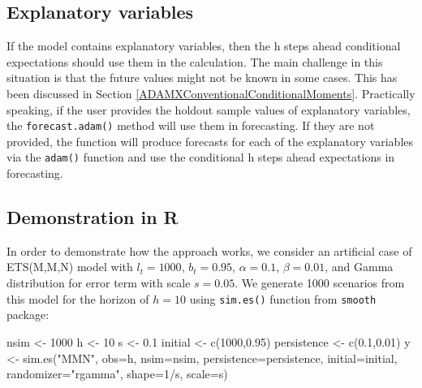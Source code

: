 \documentclass[
]{book}
\newenvironment{Shaded}{\begin{snugshade}}{\end{snugshade}}
\newcommand{\AttributeTok}[1]{\textcolor[rgb]{0.77,0.63,0.00}{#1}}
\newcommand{\DecValTok}[1]{\textcolor[rgb]{0.00,0.00,0.81}{#1}}
\newcommand{\FloatTok}[1]{\textcolor[rgb]{0.00,0.00,0.81}{#1}}
\newcommand{\FunctionTok}[1]{\textcolor[rgb]{0.00,0.00,0.00}{#1}}
\newcommand{\NormalTok}[1]{#1}
\newcommand{\OtherTok}[1]{\textcolor[rgb]{0.56,0.35,0.01}{#1}}
\newcommand{\SpecialCharTok}[1]{\textcolor[rgb]{0.00,0.00,0.00}{#1}}
\newcommand{\StringTok}[1]{\textcolor[rgb]{0.31,0.60,0.02}{#1}}
\theoremstyle{definition}
\theoremstyle{definition}
\theoremstyle{definition}
\theoremstyle{definition}
\theoremstyle{remark}
\begin{document}
\hypertarget{explanatory-variables}{%
\subsection{Explanatory variables}\label{explanatory-variables}}

If the model contains explanatory variables, then the h steps ahead conditional expectations should use them in the calculation. The main challenge in this situation is that the future values might not be known in some cases. This has been discussed in Section \ref{ADAMXConventionalConditionalMoments}. Practically speaking, if the user provides the holdout sample values of explanatory variables, the \texttt{forecast.adam()} method will use them in forecasting. If they are not provided, the function will produce forecasts for each of the explanatory variables via the \texttt{adam()} function and use the conditional h steps ahead expectations in forecasting.

\hypertarget{demonstration-in-r}{%
\subsection{Demonstration in R}\label{demonstration-in-r}}

In order to demonstrate how the approach works, we consider an artificial case of ETS(M,M,N) model with \(l_t=1000\), \(b_t=0.95\), \(\alpha=0.1\), \(\beta=0.01\), and Gamma distribution for error term with scale \(s=0.05\). We generate 1000 scenarios from this model for the horizon of \(h=10\) using \texttt{sim.es()} function from \texttt{smooth} package:

\begin{Shaded}
\begin{Highlighting}[]
\NormalTok{nsim }\OtherTok{\textless{}{-}} \DecValTok{1000}
\NormalTok{h }\OtherTok{\textless{}{-}} \DecValTok{10}
\NormalTok{s }\OtherTok{\textless{}{-}} \FloatTok{0.1}
\NormalTok{initial }\OtherTok{\textless{}{-}} \FunctionTok{c}\NormalTok{(}\DecValTok{1000}\NormalTok{,}\FloatTok{0.95}\NormalTok{)}
\NormalTok{persistence }\OtherTok{\textless{}{-}} \FunctionTok{c}\NormalTok{(}\FloatTok{0.1}\NormalTok{,}\FloatTok{0.01}\NormalTok{)}
\NormalTok{y }\OtherTok{\textless{}{-}} \FunctionTok{sim.es}\NormalTok{(}\StringTok{"MMN"}\NormalTok{, }\AttributeTok{obs=}\NormalTok{h, }\AttributeTok{nsim=}\NormalTok{nsim, }\AttributeTok{persistence=}\NormalTok{persistence,}
            \AttributeTok{initial=}\NormalTok{initial, }\AttributeTok{randomizer=}\StringTok{"rgamma"}\NormalTok{,}
            \AttributeTok{shape=}\DecValTok{1}\SpecialCharTok{/}\NormalTok{s, }\AttributeTok{scale=}\NormalTok{s)}
\end{Highlighting}
\end{Shaded}
\end{document}
